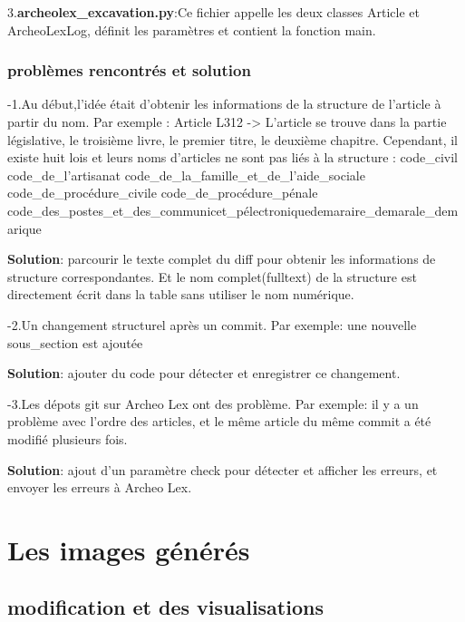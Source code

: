 \documentclass[
  oneside]{book}
\begin{document}
3.\textbf{archeolex\_excavation.py}:Ce fichier appelle les deux classes Article et ArcheoLexLog, définit les paramètres et contient la fonction main.

\hypertarget{probluxe8mes-rencontruxe9s-et-solution}{%
\subsection{problèmes rencontrés et solution}\label{probluxe8mes-rencontruxe9s-et-solution}}

-1.Au début,l'idée était d'obtenir les informations de la structure de l'article à partir du nom. Par exemple : Article L312 -\textgreater{} L'article se trouve dans la partie législative, le troisième livre, le premier titre, le deuxième chapitre.
Cependant, il existe huit lois et leurs noms d'articles ne sont pas liés à la structure : code\_civil code\_de\_l'artisanat code\_de\_la\_famille\_et\_de\_l'aide\_sociale code\_de\_procédure\_civile code\_de\_procédure\_pénale code\_des\_postes\_et\_des\_communicet\_pélectroniquedemaraire\_demarale\_demarique

\textbf{Solution}: parcourir le texte complet du diff pour obtenir les informations de structure correspondantes. Et le nom complet(fulltext) de la structure est directement écrit dans la table sans utiliser le nom numérique.

-2.Un changement structurel après un commit. Par exemple: une nouvelle sous\_section est ajoutée

\textbf{Solution}: ajouter du code pour détecter et enregistrer ce changement.

-3.Les dépots git sur Archeo Lex ont des problème. Par exemple: il y a un problème avec l'ordre des articles, et le même article du même commit a été modifié plusieurs fois.

\textbf{Solution}: ajout d'un paramètre check pour détecter et afficher les erreurs, et envoyer les erreurs à Archeo Lex.

\hypertarget{Images}{%
\chapter{Les images générés}\label{Images}}

\hypertarget{modification-et-des-visualisations}{%
\section{modification et des visualisations}\label{modification-et-des-visualisations}}
\end{document}
